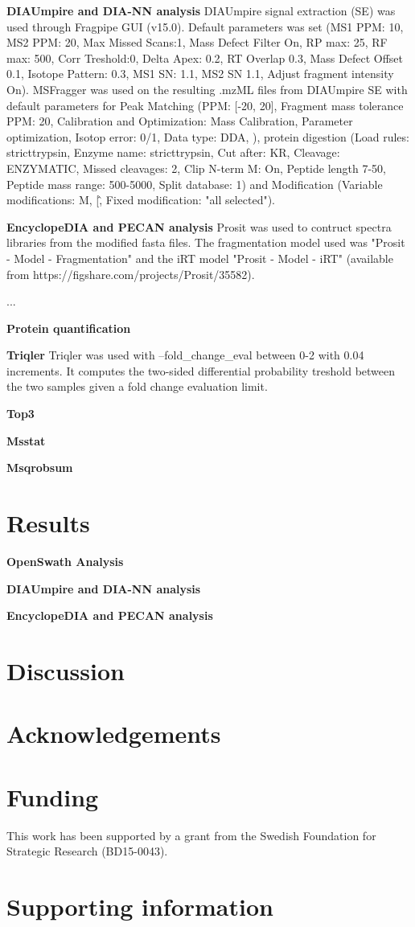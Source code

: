\documentclass[10pt,letterpaper]{article}
\begin{document}
\textbf{DIAUmpire and DIA-NN analysis}
DIAUmpire signal extraction (SE) was used through Fragpipe GUI (v15.0). Default parameters was set (MS1 PPM: 10, MS2 PPM: 20, Max Missed Scans:1, Mass Defect Filter On, RP max: 25, RF max: 500, Corr Treshold:0, Delta Apex: 0.2, RT Overlap 0.3, Mass Defect Offset 0.1, Isotope Pattern: 0.3, MS1 SN: 1.1, MS2 SN 1.1, Adjust fragment intensity On). MSFragger was used on the resulting .mzML files from DIAUmpire SE with default parameters for Peak Matching (PPM: [-20, 20], Fragment mass tolerance PPM: 20, Calibration and Optimization: Mass Calibration, Parameter optimization, Isotop error: 0/1, Data type: DDA, ), protein digestion (Load rules: stricttrypsin, Enzyme name: stricttrypsin, Cut after: KR, Cleavage: ENZYMATIC, Missed cleavages: 2, Clip N-term M: On, Peptide length 7-50, Peptide mass range: 500-5000, Split database: 1) and Modification (Variable modifications: M, \/[\^, Fixed modification: "all selected"). 

\textbf{EncyclopeDIA and PECAN analysis}
Prosit was used to contruct spectra libraries from the modified fasta files. The fragmentation model used was "Prosit - Model - Fragmentation" and the iRT model "Prosit - Model - iRT" (available from https://figshare.com/projects/Prosit/35582).

...


\textbf{Protein quantification}


\textbf{Triqler}
Triqler was used with --fold\_change\_eval between 0-2 with 0.04 increments. It computes the two-sided differential probability treshold between the two samples given a fold change evaluation limit. 

\textbf{Top3}


\textbf{Msstat}

\textbf{Msqrobsum}



\section*{Results}
\textbf{OpenSwath Analysis}

\textbf{DIAUmpire and DIA-NN analysis}

\textbf{EncyclopeDIA and PECAN analysis}


\section*{Discussion}

\section*{Acknowledgements}


\section*{Funding}

This work has been supported by a grant from the Swedish Foundation for Strategic Research (BD15-0043).

\section*{Supporting information}



\end{document}
